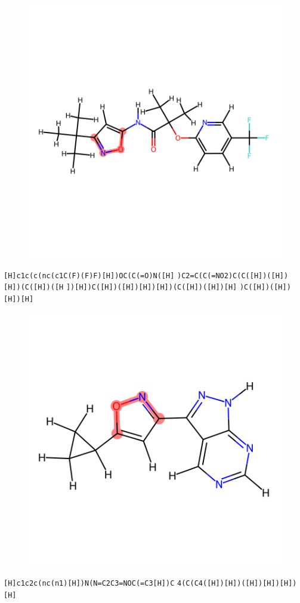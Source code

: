 \documentclass{article}
\begin{document}
\clearpage

\begin{figure}[ht]
\centering
    \includegraphics{mol278.png}
\end{figure}
\verb|[H]c1c(c(nc(c1C(F)(F)F)[H])OC(C(=O)N([H]| \verb|)C2=C(C(=NO2)C(C([H])([H])[H])(C([H])([H| \verb|])[H])C([H])([H])[H])[H])(C([H])([H])[H]| \verb|)C([H])([H])[H])[H]|

\begin{figure}[ht]
\centering
    \includegraphics{mol279.png}
\end{figure}
\verb|[H]c1c2c(nc(n1)[H])N(N=C2C3=NOC(=C3[H])C| \verb|4(C(C4([H])[H])([H])[H])[H])[H]|
\end{document}
